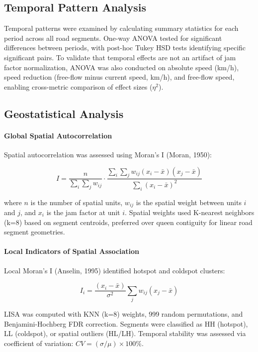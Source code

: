 \documentclass[12pt,a4paper]{article}
\begin{document}
\subsection{Temporal Pattern Analysis}

Temporal patterns were examined by calculating summary statistics for each period across all road segments. One-way ANOVA tested for significant differences between periods, with post-hoc Tukey HSD tests identifying specific significant pairs. To validate that temporal effects are not an artifact of jam factor normalization, ANOVA was also conducted on absolute speed (km/h), speed reduction (free-flow minus current speed, km/h), and free-flow speed, enabling cross-metric comparison of effect sizes ($\eta^2$).

\subsection{Geostatistical Analysis}

\paragraph{Global Spatial Autocorrelation}

Spatial autocorrelation was assessed using Moran's I (Moran, 1950):

\[I = \frac{n}{\sum_i \sum_j w_{ij}} \cdot \frac{\sum_i \sum_j w_{ij}(x_i - \bar{x})(x_j - \bar{x})}{\sum_i (x_i - \bar{x})^2}\]

where $n$ is the number of spatial units, $w_{ij}$ is the spatial weight between units $i$ and $j$, and $x_i$ is the jam factor at unit $i$. Spatial weights used K-nearest neighbors (k=8) based on segment centroids, preferred over queen contiguity for linear road segment geometries.

\paragraph{Local Indicators of Spatial Association}

Local Moran's I (Anselin, 1995) identified hotspot and coldspot clusters:

\[I_i = \frac{(x_i - \bar{x})}{\sigma^2} \sum_j w_{ij}(x_j - \bar{x})\]

LISA was computed with KNN (k=8) weights, 999 random permutations, and Benjamini-Hochberg FDR correction. Segments were classified as HH (hotspot), LL (coldspot), or spatial outliers (HL/LH). Temporal stability was assessed via coefficient of variation: $CV = (\sigma/\mu) \times 100\%$.
\end{document}
